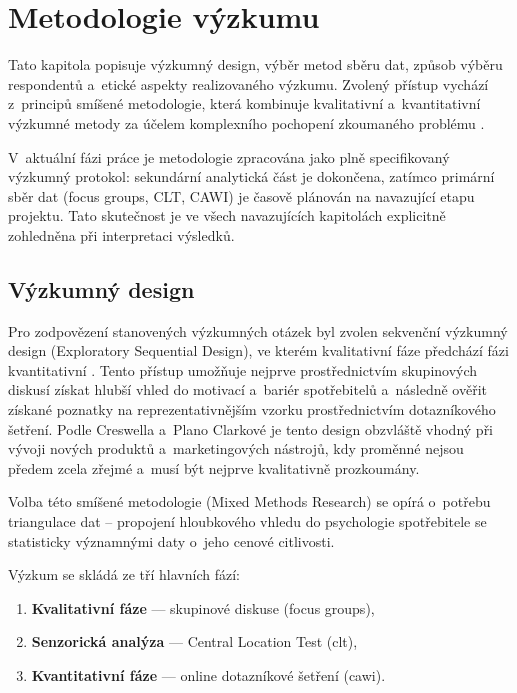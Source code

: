 \chapter{Metodologie výzkumu}
\label{chap:methodology}

Tato kapitola popisuje výzkumný design, výběr metod sběru dat, způsob výběru respondentů a~etické aspekty realizovaného výzkumu. Zvolený přístup vychází z~principů smíšené metodologie, která kombinuje kvalitativní a~kvantitativní výzkumné metody za účelem komplexního pochopení zkoumaného problému \parencite{creswell_2018}.

V~aktuální fázi práce je metodologie zpracována jako plně specifikovaný výzkumný protokol: sekundární analytická část je dokončena, zatímco primární sběr dat (focus groups, CLT, CAWI) je časově plánován na navazující etapu projektu. Tato skutečnost je ve všech navazujících kapitolách explicitně zohledněna při interpretaci výsledků.

\section{Výzkumný design}
\label{sec:meth_design}

Pro zodpovězení stanovených výzkumných otázek byl zvolen sekvenční výzkumný design (Exploratory Sequential Design), ve kterém kvalitativní fáze předchází fázi kvantitativní \parencite{creswell_2018}. Tento přístup umožňuje nejprve prostřednictvím skupinových diskusí získat hlubší vhled do motivací a~bariér spotřebitelů a~následně ověřit získané poznatky na reprezentativnějším vzorku prostřednictvím dotazníkového šetření. Podle Creswella a~Plano Clarkové je tento design obzvláště vhodný při vývoji nových produktů a~marketingových nástrojů, kdy proměnné nejsou předem zcela zřejmé a~musí být nejprve kvalitativně prozkoumány.

Volba této smíšené metodologie (Mixed Methods Research) se opírá o~potřebu triangulace dat – propojení hloubkového vhledu do psychologie spotřebitele se statisticky významnými daty o~jeho cenové citlivosti.

Výzkum se skládá ze tří hlavních fází:
\begin{enumerate}
  \item \textbf{Kvalitativní fáze} — skupinové diskuse (focus groups),
  \item \textbf{Senzorická analýza} — Central Location Test (\gls{clt}),
  \item \textbf{Kvantitativní fáze} — online dotazníkové šetření (\gls{cawi}).
\end{enumerate}

